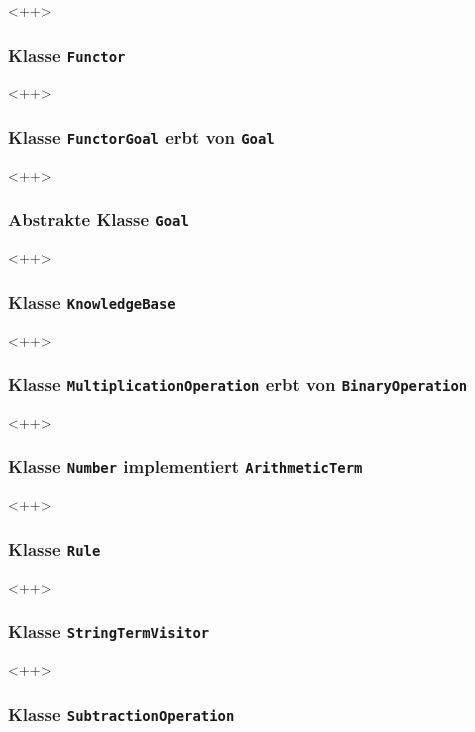 \documentclass[parskip=full,11pt,twoside]{scrartcl}
\begin{document}
<++>

\subsubsection{Klasse \texttt{Functor}}

<++>

\subsubsection{Klasse \texttt{FunctorGoal} erbt von \texttt{Goal}}

<++>

\subsubsection{Abstrakte Klasse \texttt{Goal}}

<++>

\subsubsection{Klasse \texttt{KnowledgeBase}}

<++>

\subsubsection{Klasse \texttt{MultiplicationOperation} erbt von \texttt{BinaryOperation}}

<++>

\subsubsection{Klasse \texttt{Number} implementiert \texttt{ArithmeticTerm}}

<++>

\subsubsection{Klasse \texttt{Rule}}

<++>

\subsubsection{Klasse \texttt{StringTermVisitor}}

<++>

\subsubsection{Klasse \texttt{SubtractionOperation}}
\end{document}
